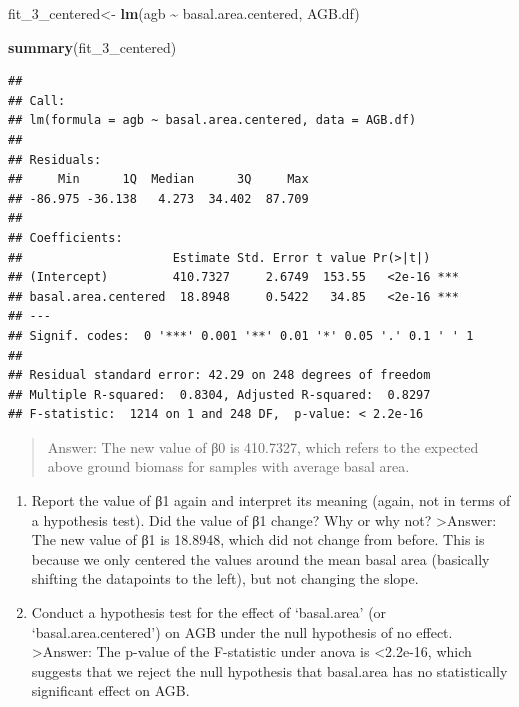 \documentclass[
]{article}
\newenvironment{Shaded}{\begin{snugshade}}{\end{snugshade}}
\newcommand{\FunctionTok}[1]{\textcolor[rgb]{0.13,0.29,0.53}{\textbf{#1}}}
\newcommand{\NormalTok}[1]{#1}
\newcommand{\OtherTok}[1]{\textcolor[rgb]{0.56,0.35,0.01}{#1}}
\newcommand{\SpecialCharTok}[1]{\textcolor[rgb]{0.81,0.36,0.00}{\textbf{#1}}}
\begin{document}
\begin{Shaded}
\begin{Highlighting}[]
\NormalTok{fit\_3\_centered}\OtherTok{\textless{}{-}} \FunctionTok{lm}\NormalTok{(agb }\SpecialCharTok{\textasciitilde{}}\NormalTok{ basal.area.centered, AGB.df)}

\FunctionTok{summary}\NormalTok{(fit\_3\_centered)}
\end{Highlighting}
\end{Shaded}

\begin{verbatim}
## 
## Call:
## lm(formula = agb ~ basal.area.centered, data = AGB.df)
## 
## Residuals:
##     Min      1Q  Median      3Q     Max 
## -86.975 -36.138   4.273  34.402  87.709 
## 
## Coefficients:
##                     Estimate Std. Error t value Pr(>|t|)    
## (Intercept)         410.7327     2.6749  153.55   <2e-16 ***
## basal.area.centered  18.8948     0.5422   34.85   <2e-16 ***
## ---
## Signif. codes:  0 '***' 0.001 '**' 0.01 '*' 0.05 '.' 0.1 ' ' 1
## 
## Residual standard error: 42.29 on 248 degrees of freedom
## Multiple R-squared:  0.8304, Adjusted R-squared:  0.8297 
## F-statistic:  1214 on 1 and 248 DF,  p-value: < 2.2e-16
\end{verbatim}

\begin{quote}
Answer: The new value of β0 is 410.7327, which refers to the expected
above ground biomass for samples with average basal area.
\end{quote}

\begin{enumerate}
\def\labelenumi{\alph{enumi}.}
\setcounter{enumi}{3}
\item
  Report the value of β1 again and interpret its meaning (again, not in
  terms of a hypothesis test). Did the value of β1 change? Why or why
  not? \textgreater Answer: The new value of β1 is 18.8948, which did
  not change from before. This is because we only centered the values
  around the mean basal area (basically shifting the datapoints to the
  left), but not changing the slope.
\item
  Conduct a hypothesis test for the effect of `basal.area' (or
  `basal.area.centered') on AGB under the null hypothesis of no effect.
  \textgreater Answer: The p-value of the F-statistic under anova is
  \textless2.2e-16, which suggests that we reject the null hypothesis
  that basal.area has no statistically significant effect on AGB.
\end{enumerate}
\end{document}
